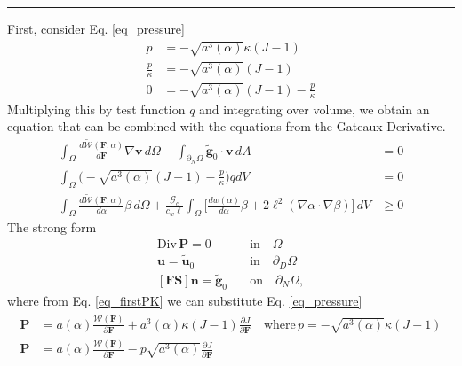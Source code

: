 \documentclass[12pt,3p]{article}
\numberwithin{equation}{section}
\begin{document}
\noindent\rule{\linewidth}{0.5pt} %
First, consider Eq. \ref{eq_pressure}
\begin{align*}
p &= -\sqrt{a^3(\alpha)} \kappa (J - 1) \\
\frac{p}{\kappa} &= -\sqrt{a^3(\alpha)} (J - 1) \\
0 &= - \sqrt{a^3(\alpha)} (J - 1) - \frac{p}{\kappa} 
\end{align*}
Multiplying this by test function $q$ and integrating over volume, we obtain an equation that can be combined with the equations from the Gateaux Derivative. 
\begin{subequations}\label{WeakForm}
\begin{align}
\int_\Omega \frac{d \widetilde{\mathcal{W}}(\mathbf{F}, \alpha)}{d \mathbf{F}} \nabla \bm{v} \, d\Omega -  \int_{\partial_N\Omega} {\tilde{\bm{g}}}_0 \cdot \bm{v} \, dA &= 0 \\
\int_\Omega \bigg( - \sqrt{a^3(\alpha)} (J - 1) - \frac{p}{\kappa} \bigg) q dV &= 0 \\
\int_\Omega \frac{d \widetilde{\mathcal{W}}(\mathbf{F}, \alpha)}{d \alpha} \beta \, d\Omega + \frac{\mathcal{G}_c}{c_w \ell} \int_\Omega \bigg[ \frac{d w(\alpha)}{d \alpha} \beta + 2 \ell^2 (\nabla \alpha \cdot \nabla \beta) \bigg] \, dV &\geq 0 
\end{align}
\end{subequations}
The strong form
\begin{subequations}\label{StrongForm}
\begin{align}
\text{Div} \, \mathbf{P} = 0 \quad &\text{in} \quad \Omega \\
\mathbf{u} = \widetilde{\mathbf{u}}_0 \quad &\text{in} \quad \partial_{D}\Omega \\
\left[\mathbf{FS}\right]\bm{n} = {\tilde{\bm{g}}}_0 \quad &\text{on} \quad \partial_{N}\Omega,
\end{align}
\end{subequations}
where from Eq. \ref{eq_firstPK} we can substitute Eq. \ref{eq_pressure}
\begin{align*}
\begin{split}
\mathbf{P} &= a(\alpha) \frac{\mathcal{W}(\mathbf{F})}{\partial \mathbf{F}} + a^3(\alpha)\kappa\left(J-1\right)\frac{\partial J}{\partial \mathbf{F}} \quad \text{where} \, p=-\sqrt{a^3(\alpha)}\kappa\left(J-1\right) \\
\mathbf{P} &= a(\alpha) \frac{\mathcal{W}(\mathbf{F})}{\partial \mathbf{F}} - p \sqrt{a^3(\alpha)} \frac{\partial J}{\partial \mathbf{F}} 
\end{split}
\end{align*}
\end{document}
